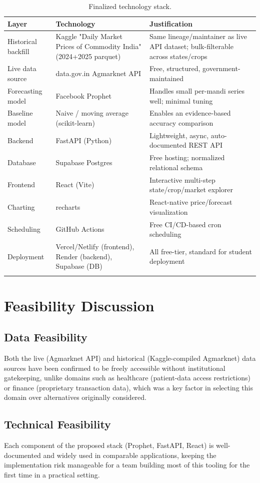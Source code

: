 \begin{longtable}{@{}p{2.8cm}p{3.8cm}p{6.5cm}@{}}
\toprule
\textbf{Layer} & \textbf{Technology} & \textbf{Justification} \\
\midrule
\endhead
Historical backfill & Kaggle "Daily Market Prices of Commodity India" (2024+2025 parquet) & Same lineage/maintainer as live API dataset; bulk-filterable across states/crops \\
Live data source & data.gov.in Agmarknet API & Free, structured, government-maintained \\
Forecasting model & Facebook Prophet & Handles small per-mandi series well; minimal tuning \\
Baseline model & Naive / moving average (scikit-learn) & Enables an evidence-based accuracy comparison \\
Backend & FastAPI (Python) & Lightweight, async, auto-documented REST API \\
Database & Supabase Postgres & Free hosting; normalized relational schema \\
Frontend & React (Vite) & Interactive multi-step state/crop/market explorer \\
Charting & recharts & React-native price/forecast visualization \\
Scheduling & GitHub Actions & Free CI/CD-based cron scheduling \\
Deployment & Vercel/Netlify (frontend), Render (backend), Supabase (DB) & All free-tier, standard for student deployment \\
\bottomrule
\caption{Finalized technology stack.}
\label{tab:techstack}
\end{longtable}

\section{Feasibility Discussion}
\subsection{Data Feasibility}
Both the live (Agmarknet API) and historical (Kaggle-compiled Agmarknet)
data sources have been confirmed to be freely accessible without
institutional gatekeeping,
unlike domains such as healthcare (patient-data access restrictions) or
finance (proprietary transaction data), which was a key factor in
selecting this domain over alternatives originally considered.

\subsection{Technical Feasibility}
Each component of the proposed stack (Prophet, FastAPI, React) is
well-documented and widely used in comparable applications, keeping the
implementation risk manageable for a team building most of this tooling
for the first time in a practical setting.

